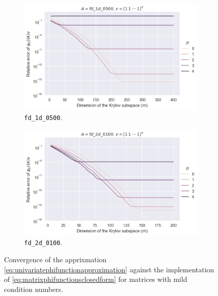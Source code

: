\begin{figure}[h!]
    \centering
    \begin{subfigure}[b]{0.45\textwidth}
        \includegraphics[width=\textwidth]{img/krylovunivariate/fd_1d_0500_recursive.png}
        \caption{\texttt{fd\_1d\_0500}.}
    \end{subfigure}
    \hfill
    \begin{subfigure}[b]{0.45\textwidth}
        \includegraphics[width=\textwidth]{img/krylovunivariate/fd_2d_0100_recursive.png}
        \caption{\texttt{fd\_2d\_0100}.}
    \end{subfigure}
    \caption{Convergence of the apprixmation \eqref{eq:univariatephifunctionapproximation} against
    the implementation of \eqref{eq:matrixphifunctionsclosedform} for matrices with mild condition numbers.}
    \label{fig:krylovmethodunivariateevaluationrecursive}
\end{figure}

